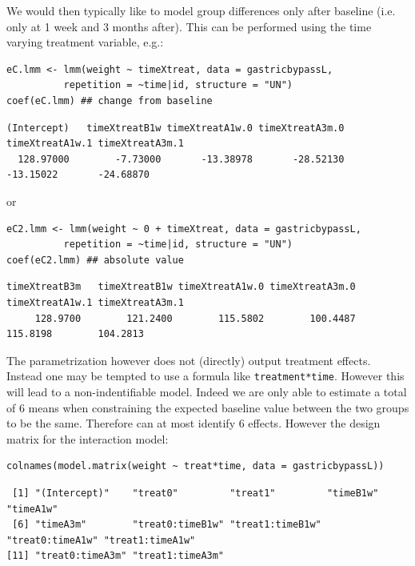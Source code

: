 \documentclass[12pt]{article}
\begin{document}
We would then typically like to model group differences only after
baseline (i.e. only at 1 week and 3 months after). This can be
performed using the time varying treatment variable, e.g.:
\lstset{language=r,label= ,caption= ,captionpos=b,numbers=none}
\begin{lstlisting}
eC.lmm <- lmm(weight ~ timeXtreat, data = gastricbypassL,
	      repetition = ~time|id, structure = "UN")
coef(eC.lmm) ## change from baseline
\end{lstlisting}

\begin{verbatim}
(Intercept)   timeXtreatB1w timeXtreatA1w.0 timeXtreatA3m.0 timeXtreatA1w.1 timeXtreatA3m.1 
  128.97000        -7.73000       -13.38978       -28.52130       -13.15022       -24.68870
\end{verbatim}


or
\lstset{language=r,label= ,caption= ,captionpos=b,numbers=none}
\begin{lstlisting}
eC2.lmm <- lmm(weight ~ 0 + timeXtreat, data = gastricbypassL,
	      repetition = ~time|id, structure = "UN")
coef(eC2.lmm) ## absolute value
\end{lstlisting}

\begin{verbatim}
timeXtreatB3m   timeXtreatB1w timeXtreatA1w.0 timeXtreatA3m.0 timeXtreatA1w.1 timeXtreatA3m.1 
     128.9700        121.2400        115.5802        100.4487        115.8198        104.2813
\end{verbatim}


The parametrization however does not (directly) output treatment
effects. Instead one may be tempted to use a formula like
\texttt{treatment*time}. However this will lead to a non-indentifiable
model. Indeed we are only able to estimate a total of 6 means when
constraining the expected baseline value between the two groups to be
the same. Therefore can at most identify 6 effects. However the design
matrix for the interaction model:
\lstset{language=r,label= ,caption= ,captionpos=b,numbers=none}
\begin{lstlisting}
colnames(model.matrix(weight ~ treat*time, data = gastricbypassL))
\end{lstlisting}

\begin{verbatim}
 [1] "(Intercept)"    "treat0"         "treat1"         "timeB1w"        "timeA1w"       
 [6] "timeA3m"        "treat0:timeB1w" "treat1:timeB1w" "treat0:timeA1w" "treat1:timeA1w"
[11] "treat0:timeA3m" "treat1:timeA3m"
\end{verbatim}
\end{document}
